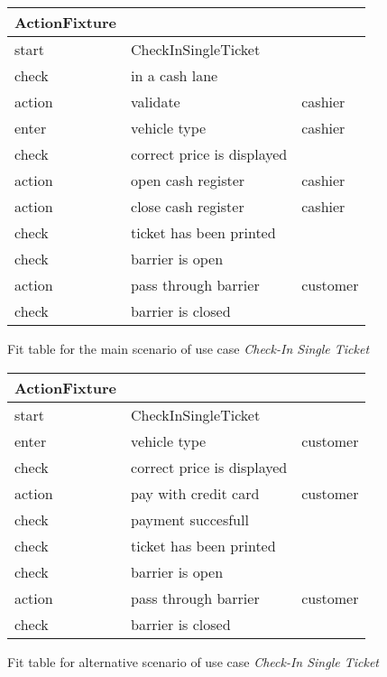 
\begin{figure}
\centering
\begin{tabular}{|l|l|l|}
\hline 
ActionFixture &  & \tabularnewline
\hline 
start & CheckInSingleTicket & \tabularnewline
\hline 
check & in a cash lane & \tabularnewline
\hline 
action & validate & cashier\tabularnewline
\hline 
enter & vehicle type & cashier\tabularnewline
\hline 
check & correct price is displayed & \tabularnewline
\hline 
action & open cash register & cashier\tabularnewline
\hline 
action & close cash register & cashier\tabularnewline
\hline 
check & ticket has been printed & \tabularnewline
\hline 
check & barrier is open & \tabularnewline
\hline 
action & pass through barrier & customer\tabularnewline
\hline 
check & barrier is closed & \tabularnewline
\hline 
\end{tabular}
\caption{Fit table for the main scenario of use case \emph{Check-In Single Ticket}}
\end{figure}

\begin{figure}
\centering
\begin{tabular}{|l|l|l|}
\hline 
ActionFixture &  & \tabularnewline
\hline 
start & CheckInSingleTicket & \tabularnewline
\hline 
enter & vehicle type & customer\tabularnewline
\hline 
check & correct price is displayed & \tabularnewline
\hline 
action & pay with credit card & customer\tabularnewline
\hline 
check & payment succesfull & \tabularnewline
\hline 
check & ticket has been printed & \tabularnewline
\hline 
check & barrier is open & \tabularnewline
\hline 
action & pass through barrier & customer\tabularnewline
\hline 
check & barrier is closed & \tabularnewline
\hline 
\end{tabular}
\caption{Fit table for alternative scenario of use case \emph{Check-In Single Ticket}}
\end{figure}